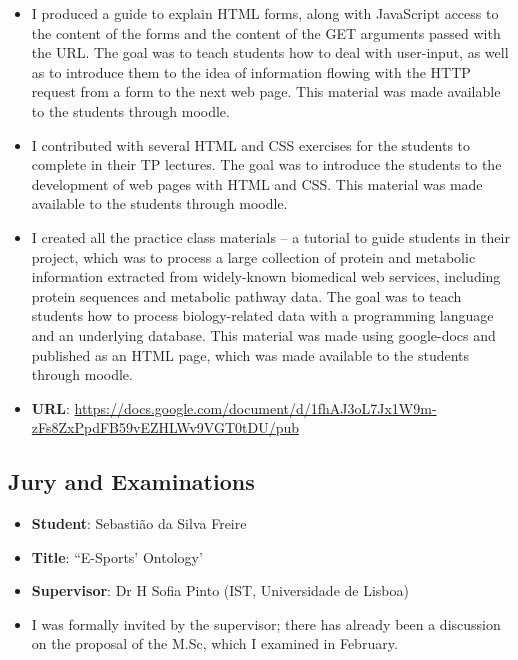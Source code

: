 \begin{itemize}
    \item I produced a guide to explain HTML forms, along with JavaScript access to the content of the forms and the content of the GET arguments passed with the URL. The goal was to teach students how to deal with user-input, as well as to introduce them to the idea of information flowing with the HTTP request from a form to the next web page. This material was made available to the students through moodle.
\end{itemize}

\begin{itemize}
    \item I contributed with several HTML and CSS exercises for the students to complete in their TP lectures. The goal was to introduce the students to the development of web pages with HTML and CSS. This material was made available to the students through moodle.
\end{itemize}

\begin{itemize}
    \item I created all the practice class materials -- a tutorial to guide students in their project, which was to process a large collection of protein and metabolic information extracted from widely-known biomedical web services, including protein sequences and metabolic pathway data. The goal was to teach students how to process biology-related data with a programming language and an underlying database. This material was made using google-docs and published as an HTML page, which was made available to the students through moodle.
    \item \textbf{URL}: \url{https://docs.google.com/document/d/1fhAJ3oL7Jx1W9m-zFs8ZxPpdFB59vEZHLWv9VGT0tDU/pub}
\end{itemize}


\subsection{Jury and Examinations}

\begin{itemize}
    \item \textbf{Student}: Sebastião da Silva Freire
    \item \textbf{Title}: ``E-Sports' Ontology'
    \item \textbf{Supervisor}: Dr H Sofia Pinto (IST, Universidade de Lisboa)
    \item I was formally invited by the supervisor; there has already been a discussion on the proposal of the M.Sc, which I examined in February.
\end{itemize}

